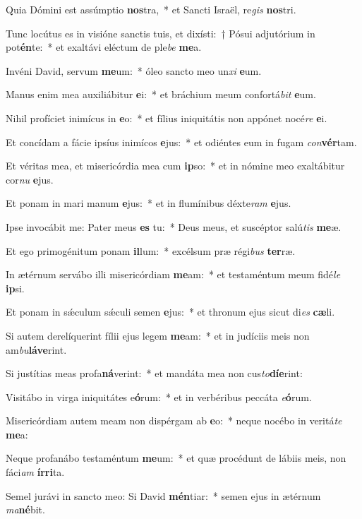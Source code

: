 \item Quia Dómini est assúmptio \textbf{nos}tra,~* et Sancti Israël, re\textit{gis} \textbf{nos}tri.
\item Tunc locútus es in visióne sanctis tuis, et dixísti:~† Pósui adjutórium in pot\textbf{én}te:~* et exaltávi eléctum de ple\textit{be} \textbf{me}a.
\item Invéni David, servum \textbf{me}um:~* óleo sancto meo un\textit{xi} \textbf{e}um.
\item Manus enim mea auxiliábitur \textbf{e}i:~* et bráchium meum confortá\textit{bit} \textbf{e}um.
\item Nihil profíciet inimícus in \textbf{e}o:~* et fílius iniquitátis non appónet nocé\textit{re} \textbf{e}i.
\item Et concídam a fácie ipsíus inimícos \textbf{e}jus:~* et odiéntes eum in fugam \textit{con}\textbf{vér}tam.
\item Et véritas mea, et misericórdia mea cum \textbf{ip}so:~* et in nómine meo exaltábitur cor\textit{nu} \textbf{e}jus.
\item Et ponam in mari manum \textbf{e}jus:~* et in flumínibus déxte\textit{ram} \textbf{e}jus.
\item Ipse invocábit me: Pater meus \textbf{es} tu:~* Deus meus, et suscéptor salú\textit{tis} \textbf{me}æ.
\item Et ego primogénitum ponam \textbf{il}lum:~* excélsum præ régi\textit{bus} \textbf{ter}ræ.
\item In ætérnum servábo illi misericórdiam \textbf{me}am:~* et testaméntum meum fidé\textit{le} \textbf{ip}si.
\item Et ponam in sǽculum sǽculi semen \textbf{e}jus:~* et thronum ejus sicut di\textit{es} \textbf{cæ}li.
\item Si autem derelíquerint fílii ejus legem \textbf{me}am:~* et in judíciis meis non am\textit{bu}\textbf{lá}\textbf{ve}rint.
\item Si justítias meas profa\textbf{ná}verint:~* et mandáta mea non cus\textit{to}\textbf{dí}\textbf{e}rint:
\item Visitábo in virga iniquitátes e\textbf{ó}rum:~* et in verbéribus peccáta \textit{e}\textbf{ó}rum.
\item Misericórdiam autem meam non dispérgam ab \textbf{e}o:~* neque nocébo in veritá\textit{te} \textbf{me}a:
\item Neque profanábo testaméntum \textbf{me}um:~* et quæ procédunt de lábiis meis, non fáci\textit{am} \textbf{ír}\textbf{ri}ta.
\item Semel jurávi in sancto meo: Si David \textbf{mén}tiar:~* semen ejus in ætérnum \textit{ma}\textbf{né}bit.
